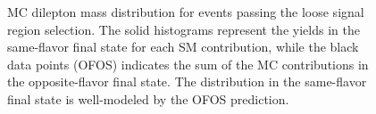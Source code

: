 \begin{figure}[hbt]
  \begin{center}
    \caption{MC dilepton mass distribution for events passing the loose signal region selection. 
	  The solid histograms represent the yields in the same-flavor
      final state for each SM contribution, while the black data points (OFOS) indicates the 
	  sum of the \ttbar MC contributions in the opposite-flavor final state.
      The \ttbar distribution in the same-flavor final state is well-modeled by the OFOS prediction.}
    \label{fig:ttbar}
  \end{center}
\end{figure}

